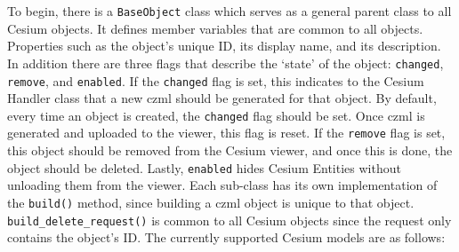 To begin, there is a \texttt{BaseObject} class which serves as a general parent
class to all Cesium objects. It defines member variables that are common to all
objects. Properties such as the object's unique ID, its display name, and its
description. In addition there are three flags that describe the `state' of the
object: \texttt{changed}, \texttt{remove}, and \texttt{enabled}. If the
\texttt{changed} flag is set, this indicates to the Cesium Handler class that a
new \gls{czml} should be generated for that object. By default, every time an
object is created, the \texttt{changed} flag should be set. Once \gls{czml} is
generated and uploaded to the viewer, this flag is reset. If the
\texttt{remove} flag is set, this object should be removed from the Cesium
viewer, and once this is done, the object should be deleted. Lastly,
\texttt{enabled} hides Cesium Entities without unloading them from the viewer.
Each sub-class has its own implementation of the \texttt{build()} method, since
building a \gls{czml} object is unique to that object.
\texttt{build\_delete\_request()} is common to all Cesium objects since the
request only contains the object's ID. The currently supported Cesium models
are as follows:

